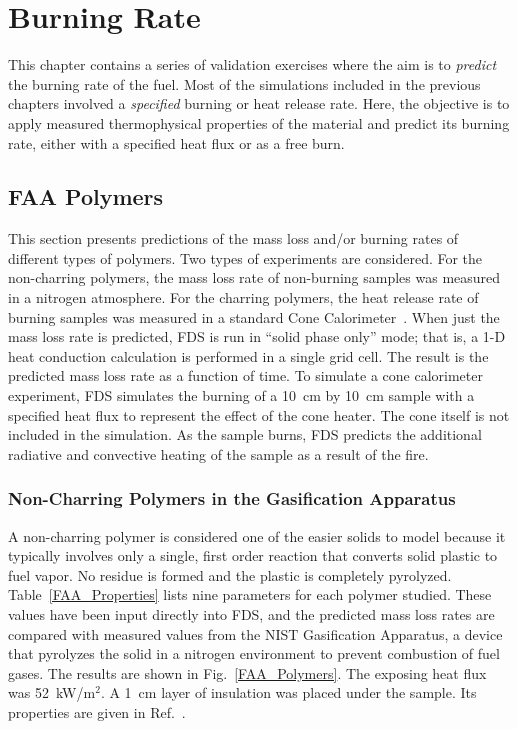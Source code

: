 
\chapter{Burning Rate}

This chapter contains a series of validation exercises where the aim is to {\em predict} the burning rate of the fuel. Most of the simulations included in the previous chapters involved
a {\em specified} burning or heat release rate. Here, the objective is to apply measured thermophysical properties of the material and predict its burning rate, either with a
specified heat flux or as a free burn.


\section{FAA Polymers}

This section presents predictions of the mass loss and/or burning rates of different types of polymers. Two types of experiments are considered. For the non-charring polymers, the
mass loss rate of non-burning samples was measured in a nitrogen atmosphere. For the charring polymers, the heat release rate of burning samples was measured in a standard
Cone Calorimeter~\cite{conecal}. When just the mass loss rate is predicted, FDS is run in ``solid phase only'' mode; that is, a 1-D heat conduction calculation is performed in a
single grid cell. The result is the predicted mass loss rate as a function of time. To simulate a cone calorimeter experiment, FDS simulates the burning of a 10~cm by 10~cm sample with
a specified heat flux to represent the effect of the cone heater. The cone itself is not included in the simulation. As the sample burns, FDS predicts the additional radiative and
convective heating of the sample as a result of the fire.

\newpage

\subsection{Non-Charring Polymers in the Gasification Apparatus}

A non-charring polymer is considered one of the easier solids to model because it typically involves only a single, first order reaction that converts solid plastic to fuel vapor.
No residue is formed and the plastic is completely pyrolyzed. Table~\ref{FAA_Properties}
lists nine parameters for each polymer studied. These values have been input directly into FDS, and the predicted mass loss rates are compared with measured values from the NIST
Gasification Apparatus, a device that pyrolyzes the solid in a nitrogen environment to prevent combustion of fuel gases. The results are shown in Fig.~\ref{FAA_Polymers}. The exposing
heat flux was 52~kW/m$^2$. A 1~cm layer of insulation was placed under the sample. Its properties are given in Ref.~\cite{Stoliarov:CF2009}.


